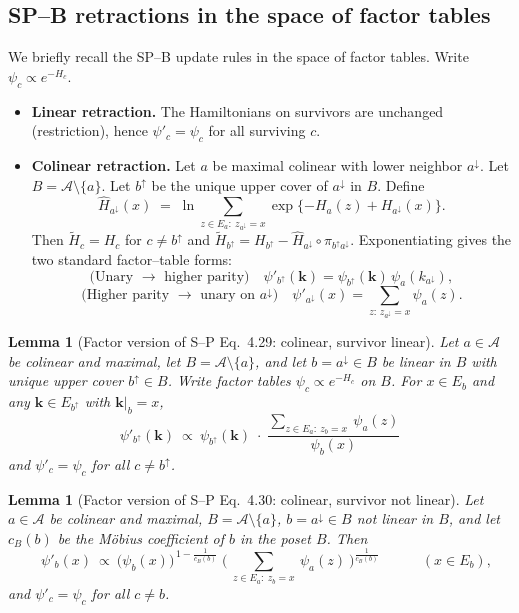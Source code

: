 \documentclass{article}
\theoremstyle{plain}
\newtheorem{lemma}[theorem]{Lemma}
\theoremstyle{definition}
\theoremstyle{remark}
\newcommand{\<}{\langle}
\renewcommand{\>}{\rangle}
\begin{document}
\subsection{SP--B retractions in the space of factor tables}\label{sec:SP-psi-rules}
We briefly recall the SP--B update rules in the space of factor tables.
Write $\psi_c\propto e^{-H_c}$.
\begin{itemize}
  \item \textbf{Linear retraction.} The Hamiltonians on survivors are unchanged (restriction), hence \(\psi'_c=\psi_c\) for all surviving \(c\).
  \item \textbf{Colinear retraction.} Let \(a\) be maximal colinear with lower neighbor \(a^{\downarrow}\).
  Let \(B=\mathcal A\setminus\{a\}\).
  Let \(b^{\uparrow}\) be the unique upper cover of \(a^{\downarrow}\) in \(B\).
  Define
  \[
  \widehat H_{a^{\downarrow}}(x)\;=\;\ln\sum_{z\in E_a:\ z_{a^{\downarrow}}=x}\exp\{-H_a(z)+H_{a^{\downarrow}}(x)\}.
  \]
  Then \( \widetilde H_c=H_c\) for \(c\neq b^{\uparrow}\) and \(\widetilde H_{b^{\uparrow}}=H_{b^{\uparrow}}-\widehat H_{a^{\downarrow}}\circ\pi_{b^{\uparrow}a^{\downarrow}}\).
  Exponentiating gives the two standard factor--table forms:
  \[
  \text{(Unary }\to\text{ higher parity)}\quad
  \psi'_{b^{\uparrow}}(\mathbf k)=\psi_{b^{\uparrow}}(\mathbf k)\,\psi_a(k_{a^{\downarrow}}),
  \]
  \[
  \text{(Higher parity }\to\text{ unary on }a^{\downarrow})\quad
  \psi'_{a^{\downarrow}}(x)=\sum_{z:\,z_{a^{\downarrow}}=x}\psi_a(z).
  \]
\end{itemize}

\medskip

\begin{lemma}[Factor version of S--P Eq.~4.29: colinear, survivor linear]
Let $a\in\mathcal A$ be colinear and maximal, let $B=\mathcal A\setminus\{a\}$, and let
$b=a^{\downarrow}\in B$ be \emph{linear} in $B$ with unique upper cover $b^{\uparrow}\in B$.
Write factor tables $\psi_c\propto e^{-H_c}$ on $B$.
For $x\in E_b$ and any $\mathbf k\in E_{b^{\uparrow}}$ with $\mathbf k|_{b}=x$,
\[
\quad
\psi'_{b^{\uparrow}}(\mathbf k)\ \propto\
\psi_{b^{\uparrow}}(\mathbf k)\;\cdot\;
\frac{\displaystyle\sum_{z\in E_{a}:\ z_{b}=x}\ \psi_{a}(z)}{\psi_{b}(x)}
\quad
\]
and $\psi'_c=\psi_c$ for all $c\neq b^{\uparrow}$.

\end{lemma}

\begin{lemma}[Factor version of S--P Eq.~4.30: colinear, survivor not linear]
Let $a\in\mathcal A$ be colinear and maximal, $B=\mathcal A\setminus\{a\}$,
$b=a^{\downarrow}\in B$ \emph{not} linear in $B$, and let $c_B(b)$ be the
Möbius coefficient of $b$ in the poset $B$.
Then
\[
\quad
\psi'_{b}(x)\ \propto\
\big(\psi_b(x)\big)^{\,1-\frac{1}{c_B(b)}}\;
\Big(\ \sum_{z\in E_{a}:\ z_b=x}\ \psi_a(z)\ \Big)^{\frac{1}{c_B(b)}}
\quad\qquad (x\in E_b),
\]
and $\psi'_c=\psi_c$ for all $c\neq b$.
\end{lemma}
\end{document}
